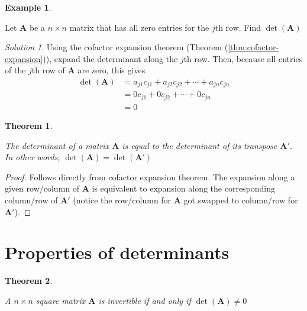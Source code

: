 \documentclass[
]{book}
\newtheorem{theorem}{Theorem}[chapter]
\theoremstyle{definition}
\theoremstyle{definition}
\newtheorem{example}{Example}[chapter]
\theoremstyle{definition}
\theoremstyle{remark}
\newtheorem*{solution}{Solution}
\begin{document}
\begin{example}
\protect\hypertarget{exm:unlabeled-div-105}{}\label{exm:unlabeled-div-105}

Let \(\mathbf{A}\) be a \(n \times n\) matrix that has all zero entries for the \(j\)th row. Find \(\det(\mathbf{A})\)

\end{example}

\begin{solution}

Using the cofactor expansion theorem (Theorem (\ref{thm:cofactor-expansion})), expand the determinant along the \(j\)th row. Then, because all entries of the \(j\)th row of \(\mathbf{A}\) are zero, this gives
\[
\begin{aligned}
\det(\mathbf{A}) & = a_{j1} c_{j1} + a_{j2} c_{j2} + \cdots + a_{jn} c_{jn} \\
& = 0 c_{j1} + 0 c_{j2} + \cdots + 0 c_{jn} \\
& = 0
\end{aligned}
\]

\end{solution}

\begin{theorem}
\protect\hypertarget{thm:unlabeled-div-106}{}\label{thm:unlabeled-div-106}

The determinant of a matrix \(\mathbf{A}\) is equal to the determinant of its transpose \(\mathbf{A}'\). In other words, \(\det(\mathbf{A}) = \det(\mathbf{A}')\)

\end{theorem}

\begin{proof}

Follows directly from cofactor expansion theorem. The expansion along a given row/column of \(\mathbf{A}\) is equivalent to expansion along the corresponding column/row of \(\mathbf{A}'\) (notice the row/column for \(\mathbf{A}\) got swapped to column/row for \(\mathbf{A}'\)).

\end{proof}

\hypertarget{properties-of-determinants}{%
\section{Properties of determinants}\label{properties-of-determinants}}

\begin{theorem}
\protect\hypertarget{thm:unlabeled-div-107}{}\label{thm:unlabeled-div-107}

A \(n \times n\) square matrix \(\mathbf{A}\) is invertible if and only if \(\det(\mathbf{A}) \neq 0\)

\end{theorem}
\end{document}
